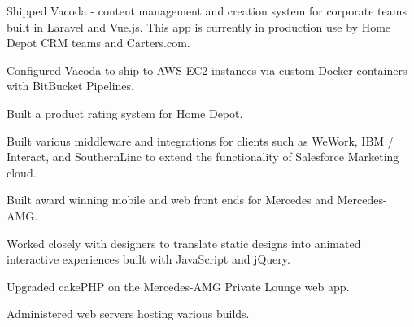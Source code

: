 \documentclass[]{pb-resume-openfonts}
\begin{document}
\begin{minipage}[t]{0.66\textwidth}
\begin{tightemize}
\item Shipped Vacoda - content management and creation system for corporate teams built in Laravel and Vue.js. This app is currently in production use by Home Depot CRM teams and Carters.com.
\item Configured Vacoda to ship to AWS EC2 instances via custom Docker containers with BitBucket Pipelines.
\item Built a product rating system for Home Depot.
\item Built various middleware and integrations for clients such as WeWork, IBM / Interact, and SouthernLinc to extend the functionality of Salesforce Marketing cloud.
\end{tightemize}  
\sectionsep

\vspace{\topsep} %
\begin{tightemize}
\item Built award winning mobile and web front ends for Mercedes and Mercedes-AMG.
\item Worked closely with designers to translate static designs into animated interactive experiences built with JavaScript and jQuery.
\item Upgraded cakePHP on the Mercedes-AMG Private Lounge web app. 
\item Administered web servers hosting various builds.
\end{tightemize}
\sectionsep

\end{minipage} 
\end{document}
